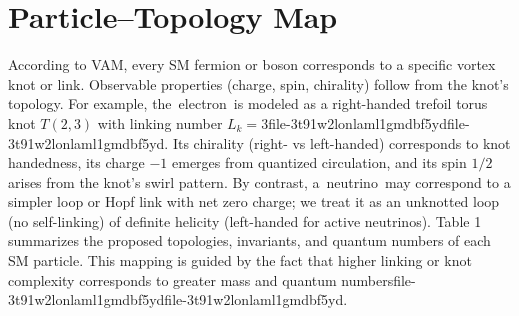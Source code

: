 \documentclass[a4paper,12pt]{article}
\begin{document}
\section*{Particle–Topology Map}
According to VAM, every SM fermion or boson corresponds to a specific vortex knot or link. Observable properties (charge, spin, chirality) follow from the knot’s topology. For example, the electron is modeled as a right-handed trefoil torus knot $T(2,3)$ with linking number $L_k=3$file-3t91w2lonlaml1gmdbf5ydfile-3t91w2lonlaml1gmdbf5yd. Its chirality (right- vs left-handed) corresponds to knot handedness, its charge $-1$ emerges from quantized circulation, and its spin $1/2$ arises from the knot’s swirl pattern. By contrast, a neutrino may correspond to a simpler loop or Hopf link with net zero charge; we treat it as an unknotted loop (no self-linking) of definite helicity (left-handed for active neutrinos). Table 1 summarizes the proposed topologies, invariants, and quantum numbers of each SM particle. This mapping is guided by the fact that higher linking or knot complexity corresponds to greater mass and quantum numbersfile-3t91w2lonlaml1gmdbf5ydfile-3t91w2lonlaml1gmdbf5yd.
\end{document}
